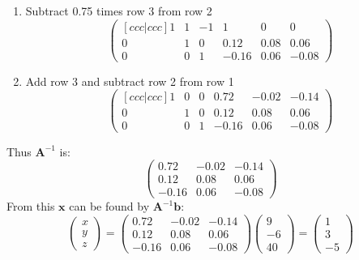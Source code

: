 \begin{enumerate}
\begin{enumerate}
	\item Subtract 0.75 times row 3 from row 2
	\begin{equation*}
		\begin{pmatrix}[ccc|ccc]
			1&1&-1&1&0&0\\0&1&0&0.12&0.08&0.06\\0&0&1&-0.16&0.06&-0.08
		\end{pmatrix}
	\end{equation*}	
	\item Add row 3 and subtract row 2 from row 1
	\begin{equation*}
		\begin{pmatrix}[ccc|ccc]
			1&0&0&0.72&-0.02&-0.14\\0&1&0&0.12&0.08&0.06\\0&0&1&-0.16&0.06&-0.08
		\end{pmatrix}
	\end{equation*}
	\end{enumerate}
Thus $\boldsymbol{A}^{-1}$ is:
\begin{equation*}
	\begin{pmatrix}
		0.72&-0.02&-0.14\\0.12&0.08&0.06\\-0.16&0.06&-0.08
	\end{pmatrix}
\end{equation*}
From this $\boldsymbol{x}$ can be found by $\boldsymbol{A}^{-1}\boldsymbol{b}$:
\begin{equation*}\boxed{
	\begin{pmatrix}
	x\\y\\z
	\end{pmatrix}=
	\begin{pmatrix}
		0.72&-0.02&-0.14\\0.12&0.08&0.06\\-0.16&0.06&-0.08
	\end{pmatrix}
	\begin{pmatrix}
		9\\-6\\40
	\end{pmatrix}=
	\begin{pmatrix}
	1\\3\\-5
	\end{pmatrix}
	}
\end{equation*}
\end{enumerate}
